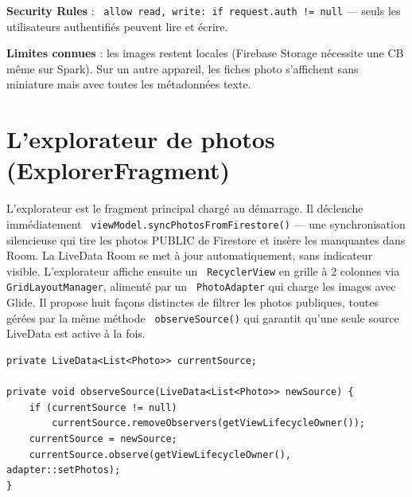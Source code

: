 \documentclass[a4paper,12pt,openany]{report}
\newcommand{\ic}[1]{\texttt{\small\colorbox{lightbg}{\color{navy!90} #1}}}
\begin{document}
\textbf{Security Rules} : \ic{allow read, write: if request.auth != null} —
seuls les utilisateurs authentifiés peuvent lire et écrire.

\textbf{Limites connues} : les images restent locales (Firebase Storage nécessite une CB
même sur Spark). Sur un autre appareil, les fiches photo s'affichent sans miniature
mais avec toutes les métadonnées texte.

\section{L'explorateur de photos (ExplorerFragment)}

L'explorateur est le fragment principal chargé au démarrage. Il déclenche
immédiatement \ic{viewModel.syncPhotosFromFirestore()} — une synchronisation
silencieuse qui tire les photos PUBLIC de Firestore et insère les manquantes dans Room.
La LiveData Room se met à jour automatiquement, sans indicateur visible.
L'explorateur affiche ensuite un \ic{RecyclerView} en grille à 2 colonnes via
\ic{GridLayoutManager}, alimenté par un \ic{PhotoAdapter} qui charge les images avec Glide. Il propose huit
façons distinctes de filtrer les photos publiques, toutes gérées par la même
méthode \ic{observeSource()} qui garantit qu'une seule source LiveData est
active à la fois.

\begin{lstlisting}
private LiveData<List<Photo>> currentSource;

private void observeSource(LiveData<List<Photo>> newSource) {
    if (currentSource != null)
        currentSource.removeObservers(getViewLifecycleOwner());
    currentSource = newSource;
    currentSource.observe(getViewLifecycleOwner(), adapter::setPhotos);
}
\end{lstlisting}
\end{document}
